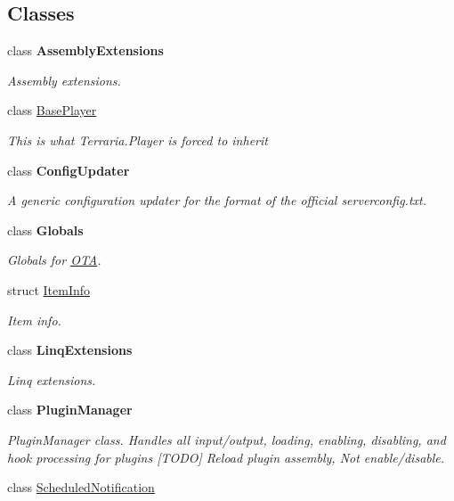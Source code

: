 \subsection*{Classes}
\begin{DoxyCompactItemize}
\item 
class {\bfseries Assembly\+Extensions}
\begin{DoxyCompactList}\small\item\em Assembly extensions. \end{DoxyCompactList}\item 
class \hyperlink{class_o_t_a_1_1_base_player}{Base\+Player}
\begin{DoxyCompactList}\small\item\em This is what Terraria.\+Player is forced to inherit \end{DoxyCompactList}\item 
class {\bfseries Config\+Updater}
\begin{DoxyCompactList}\small\item\em A generic configuration updater for the format of the official serverconfig.\+txt. \end{DoxyCompactList}\item 
class {\bfseries Globals}
\begin{DoxyCompactList}\small\item\em Globals for \hyperlink{namespace_o_t_a}{O\+T\+A}. \end{DoxyCompactList}\item 
struct \hyperlink{struct_o_t_a_1_1_item_info}{Item\+Info}
\begin{DoxyCompactList}\small\item\em Item info. \end{DoxyCompactList}\item 
class {\bfseries Linq\+Extensions}
\begin{DoxyCompactList}\small\item\em Linq extensions. \end{DoxyCompactList}\item 
class {\bfseries Plugin\+Manager}
\begin{DoxyCompactList}\small\item\em Plugin\+Manager class. Handles all input/output, loading, enabling, disabling, and hook processing for plugins \mbox{[}T\+O\+D\+O\mbox{]} Reload plugin assembly, Not enable/disable. \end{DoxyCompactList}\item 
class \hyperlink{class_o_t_a_1_1_scheduled_notification}{Scheduled\+Notification}

\end{DoxyCompactItemize}
